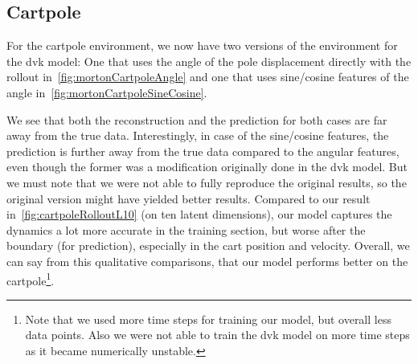 	\subsection{Cartpole}
		For the cartpole environment, we now have two versions of the environment for the \ac{dvk} model: One that uses the angle of the pole displacement directly with the rollout in~\autoref{fig:mortonCartpoleAngle} and one that uses sine/cosine features of the angle in~\autoref{fig:mortonCartpoleSineCosine}.

		We see that both the reconstruction and the prediction for both cases are far away from the true data. Interestingly, in case of the sine/cosine features, the prediction is further away from the true data compared to the angular features, even though the former was a modification originally done in the \ac{dvk} model. But we must note that we were not able to fully reproduce the original results, so the original version might have yielded better results. Compared to our result in~\autoref{fig:cartpoleRolloutL10} (on ten latent dimensions), our model captures the dynamics a lot more accurate in the training section, but worse after the boundary (\ie for prediction), especially in the cart position and velocity. Overall, we can say from this qualitative comparisons, that our model performs better on the cartpole\footnote{Note that we used more time steps for training our model, but overall less data points. Also we were not able to train the \ac{dvk} model on more time steps as it became numerically unstable.}.

